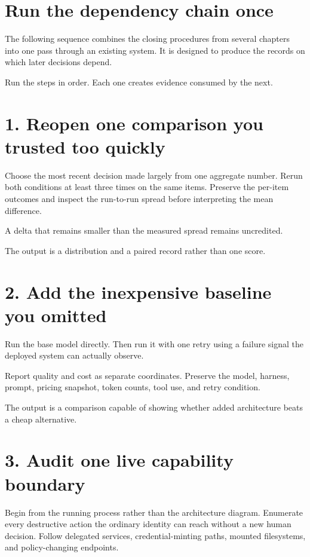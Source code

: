 \section{Run the dependency chain once}\label{run-the-dependency-chain-once}

The following sequence combines the closing procedures from several chapters into one pass through an existing system. It is designed to produce the records on which later decisions depend.

Run the steps in order. Each one creates evidence consumed by the next.

\section{1. Reopen one comparison you trusted too quickly}\label{reopen-one-comparison-you-trusted-too-quickly}

Choose the most recent decision made largely from one aggregate number. Rerun both conditions at least three times on the same items. Preserve the per-item outcomes and inspect the run-to-run spread before interpreting the mean difference.

A delta that remains smaller than the measured spread remains uncredited.

The output is a distribution and a paired record rather than one score.

\section{2. Add the inexpensive baseline you omitted}\label{add-the-inexpensive-baseline-you-omitted}

Run the base model directly. Then run it with one retry using a failure signal the deployed system can actually observe.

Report quality and cost as separate coordinates. Preserve the model, harness, prompt, pricing snapshot, token counts, tool use, and retry condition.

The output is a comparison capable of showing whether added architecture beats a cheap alternative.

\section{3. Audit one live capability boundary}\label{audit-one-live-capability-boundary}

Begin from the running process rather than the architecture diagram. Enumerate every destructive action the ordinary identity can reach without a new human decision. Follow delegated services, credential-minting paths, mounted filesystems, and policy-changing endpoints.

